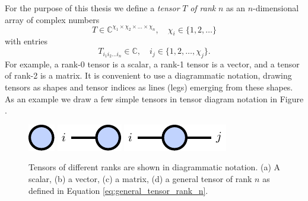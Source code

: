 For the purpose of this thesis we define a \textit{tensor} $T$ \textit{of rank} $n$ as an $n$-dimensional array of complex numbers
\begin{equation}
	\label{eq:general_tensor_rank_n}
	T \in \mathbb{C}^{\chi_1\times\chi_2\times\dots\times\chi_n}, \quad \chi_i \in \{1, 2, \dots\}
\end{equation}
with entries
\begin{equation}
	T_{i_1i_2\dots i_n} \in \mathbb{C}, \quad i_j \in \{1, 2, \dots, \chi_j\}.
\end{equation}
For example, a rank-0 tensor is a scalar, a rank-1 tensor is a vector, and a tensor of rank-2 is a matrix. It is convenient to use a diagrammatic notation, drawing tensors as shapes and tensor indices as lines (legs) emerging from these shapes. As an example we draw a few simple tensors in tensor diagram notation in Figure . \par
\begin{figure}[ht]
	\centering
	\subcaptionbox{\label{fig:basic_tensor_diagrams_scalar}}
	{%
		\raisebox{\dimexpr.5\ht\largestimage-.5\height}
		{%
			\includegraphics[scale=1]{figures/tikz/Tensor_Networks/basic_diagrams/basic_diagrams_a.pdf}
		}
	}
	\quad\quad
	\subcaptionbox{\label{fig:basic_tensor_diagrams_vector}}
	{%
		\raisebox{\dimexpr.5\ht\largestimage-.5\height}
		{%
			\includegraphics[scale=1]{figures/tikz/Tensor_Networks/basic_diagrams/basic_diagrams_b.pdf}
		}
	}
	\quad\quad
	\subcaptionbox{\label{fig:basic_tensor_diagrams_matrix}}
	{%
		\raisebox{\dimexpr.5\ht\largestimage-.5\height}
		{%
			\includegraphics[scale=1]{figures/tikz/Tensor_Networks/basic_diagrams/basic_diagrams_c.pdf}
		}
	}
	\quad\quad
	\subcaptionbox{\label{fig:basic_tensor_diagrams_rank_n_tensor}}
	{%
		\usebox{\largestimage}
	}
\caption{Tensors of different ranks are shown in diagrammatic notation. (a) A scalar, (b) a vector, (c) a matrix, (d) a general tensor of rank $n$ as defined in Equation \eqref{eq:general_tensor_rank_n}.}
\label{fig:basic_tensor_diagrams}
\end{figure}
